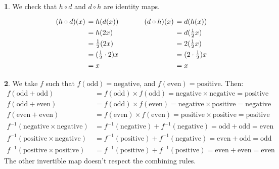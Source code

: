 \documentclass{article}
\theoremstyle{definition}
\theoremstyle{definition}
\theoremstyle{definition}
\newtheorem{solution-internal}{}[subsection]
\newenvironment{solution}{
  \begin{solution-internal}
}{
  \end{solution-internal}
}
\begin{document}
\begin{solution}
We check that $h \circ d$ and $d \circ h$ are identity maps.
\[
\arraycolsep=2pt\renewcommand{\arraystretch}{1.3}
\begin{array}{rl p{1cm} rl}
  (h \circ d)(x) &= h (d (x)) & &    (d \circ h)(x) &= d (h (x)) \\
                 &= h (2 x) & &                   &= d (\frac{1}{2} x) \\
                 &= \frac{1}{2} (2 x) & &         &= 2 (\frac{1}{2} x) \\
                 &= (\frac{1}{2} \cdot 2) x & &   &= (2 \cdot \frac{1}{2}) x\\
                 &= x & &                           &= x
\end{array}
\]
\end{solution}
\begin{solution}
\newcommand{\od}{\mathrm{odd}}
\newcommand{\ev}{\mathrm{even}}
\newcommand{\np}{\mathrm{negative}}
\newcommand{\po}{\mathrm{positive}}

We take $f$ such that $f(\od) = \np$, and $f(\ev) = \po$.
Then:
\begin{align*}
f(\od + \od) & = f(\od) \times f(\od) = \np \times \np = \po \\
f(\od + \ev) & = f(\od) \times f(\ev) = \np \times \po = \np \\
f(\ev + \ev) & = f(\ev) \times f(\ev) = \po \times \po = \po \\
f^{-1}(\np \times \np) & = f^{-1}(\np) + f^{-1}(\np) = \od + \od = \ev \\
f^{-1}(\po \times \np) & = f^{-1}(\po) + f^{-1}(\np) = \ev + \od = \od \\
f^{-1}(\po \times \po) & = f^{-1}(\po) + f^{-1}(\po) = \ev + \ev = \ev
\end{align*}
The other invertible map doesn't respect the combining rules.
\end{solution}
\end{document}

